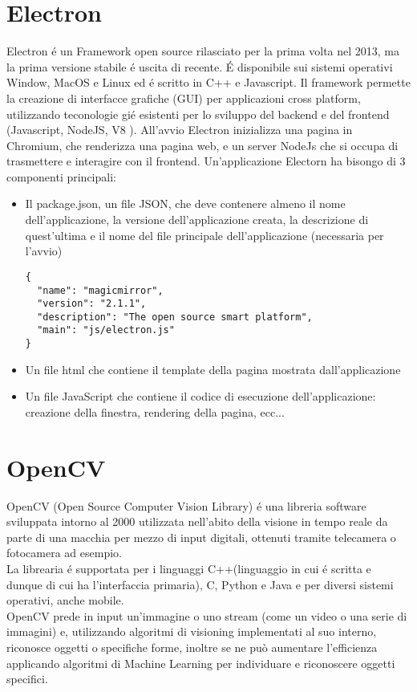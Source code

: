 \section{Electron}
Electron \'e un Framework open source rilasciato per la prima volta nel 2013, ma la prima versione
stabile \'e uscita di recente. \'E disponibile sui sistemi operativi Window, MacOS e Linux ed \'e scritto
in C++ e Javascript. Il framework permette la creazione di interfacce grafiche (GUI) per
applicazioni cross platform, utilizzando teconologie gi\'e esistenti per lo sviluppo del backend e del frontend
(Javascript, NodeJS, V8 \cite{V8}).
All'avvio Electron inizializza una pagina in Chromium, che renderizza una pagina web, e un server
NodeJs che si occupa di trasmettere e interagire con il frontend.
Un'applicazione Electorn ha bisongo di 3 componenti principali:
\begin{itemize}
\item Il package.json, un file JSON, che deve contenere almeno il nome dell'applicazione,
la versione dell'applicazione creata, la descrizione di quest'ultima e il
 nome del file principale dell'applicazione (necessaria per l'avvio)
\begin{lstlisting}
{
  "name": "magicmirror",
  "version": "2.1.1",
  "description": "The open source smart platform",
  "main": "js/electron.js"
}
\end{lstlisting}
\item Un file html che contiene il template della pagina mostrata dall'applicazione
\item Un file JavaScript che contiene il codice di esecuzione dell'applicazione: creazione della finestra,
rendering della pagina, ecc...
\end{itemize}

\section{OpenCV}
OpenCV (Open Source Computer Vision Library) \'e una libreria software sviluppata intorno al 2000
utilizzata nell'abito della visione in tempo reale
da parte di una macchia per mezzo di input digitali, ottenuti tramite telecamera o fotocamera ad esempio.\\
La librearia \'e supportata per i linguaggi C++(linguaggio in cui \'e scritta e dunque di cui ha l'interfaccia primaria), C, Python e Java e
per diversi sistemi operativi, anche mobile.\\
OpenCV prede in input un'immagine o uno stream (come un video o una serie di immagini) e, utilizzando algoritmi
di visioning implementati al suo interno, riconosce oggetti o specifiche forme, inoltre se ne può aumentare l'efficienza
applicando algoritmi di Machine Learning per individuare e riconoscere oggetti specifici.

